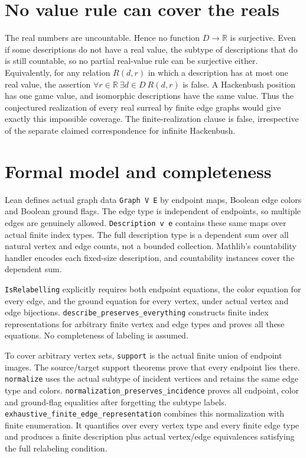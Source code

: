 \documentclass[10pt,a4paper]{article}
\begin{document}
\section*{No value rule can cover the reals}
The real numbers are uncountable. Hence no function $D\to\mathbb R$
is surjective. Even if some descriptions do not have a real value,
the subtype of descriptions that do is still countable, so no partial
real-value rule can be surjective either.
Equivalently, for any relation $R(d,r)$ in which a description has at
most one real value, the assertion
$\forall r\in\mathbb R\ \exists d\in D\ R(d,r)$ is false.
A Hackenbush position has one game value, and isomorphic descriptions
have the same value. Thus the conjectured realization of every real
surreal by finite edge graphs would give exactly this impossible
coverage. The finite-realization clause is false, irrespective of the
separate claimed correspondence for infinite Hackenbush.

\newpage
\section*{Formal model and completeness}
\raggedright
Lean defines actual graph data \texttt{Graph V E} by endpoint maps,
Boolean edge colors and Boolean ground flags. The edge type is
independent of endpoints, so multiple edges are genuinely allowed.
\texttt{Description v e} contains these same maps over actual finite
index types. The full description type is a dependent sum over all
natural vertex and edge counts, not a bounded collection.
Mathlib's countability handler encodes each fixed-size description,
and countability instances cover the dependent sum.

\texttt{IsRelabelling} explicitly requires both endpoint equations,
the color equation for every edge, and the ground equation for every
vertex, under actual vertex and edge bijections.
\texttt{describe\_preserves\_everything} constructs finite index
representations for arbitrary finite vertex and edge types and proves
all these equations. No completeness of labeling is assumed.

To cover arbitrary vertex sets, \texttt{support} is the actual finite
union of endpoint images. The source/target support theorems prove that
every endpoint lies there. \texttt{normalize} uses the actual subtype
of incident vertices and retains the same edge type and colors.
\texttt{normalization\_preserves\_incidence} proves all endpoint,
color and ground-flag equalities after forgetting the subtype labels.
\texttt{exhaustive\_finite\_edge\_representation} combines this
normalization with finite enumeration. It quantifies over every vertex
type and every finite edge type and produces a finite description plus
actual vertex/edge equivalences satisfying the full relabeling condition.
\end{document}
